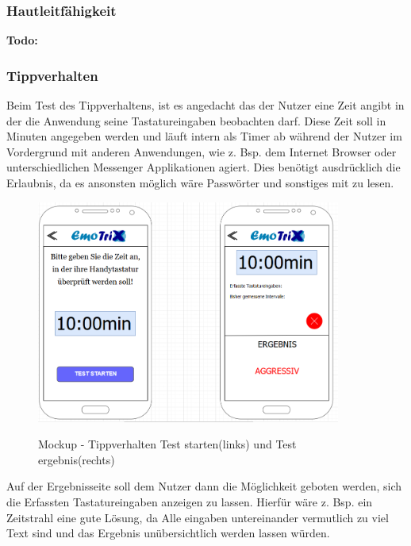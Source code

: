 \subsubsection{Hautleitfähigkeit}
\textbf{Todo:}
\subsubsection{Tippverhalten}
Beim Test des Tippverhaltens, ist es angedacht das der Nutzer eine Zeit angibt in der die Anwendung seine Tastatureingaben beobachten darf. Diese Zeit soll in Minuten angegeben werden und läuft intern als Timer ab während der Nutzer im Vordergrund mit anderen Anwendungen, wie z. Bsp. dem Internet Browser oder unterschiedlichen Messenger Applikationen agiert. Dies benötigt ausdrücklich die Erlaubnis, da es ansonsten möglich wäre Passwörter und sonstiges mit zu lesen. 
\begin{figure}[h]
	\centering
	\includegraphics[width=10cm]{Bilder/Mockup-Tippverhalten.png}
	\label{img:Mockup-Tippverhalten}
	\caption[Mockup - Tippverhalten Test starten(links) und Test ergebnis(rechts)]{Mockup - Tippverhalten Test starten(links) und Test ergebnis(rechts)}
\end{figure}%
Auf der Ergebnisseite soll dem Nutzer dann die Möglichkeit geboten werden, sich die Erfassten Tastatureingaben anzeigen zu lassen. Hierfür wäre z. Bsp. ein Zeitstrahl eine gute Lösung, da Alle eingaben untereinander vermutlich zu viel Text sind und das Ergebnis unübersichtlich werden lassen würden. 
